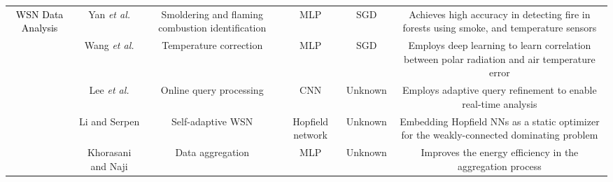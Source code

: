 \documentclass[journal,comsoc,letter]{IEEEtran}
\newcommand{\rev}[1]{\textcolor{black}{#1}}
\begin{document}
\begin{table*}[h!]
\begin{tabular}{|c|C{2CM}|C{3CM}|C{1.5CM}|C{2CM}|C{3.8CM}|}
\multirow{7}{*}{\rev{WSN Data Analysis}}              & Yan \emph{et al.} \cite{yan2016real}                         & Smoldering and flaming combustion identification                                                       & MLP                                          & SGD                                                           & Achieves high accuracy in detecting fire in forests using smoke,  and temperature sensors                                                     \\  
                                                     & Wang \emph{et al.} \cite{wang2017temperature}                & Temperature correction                                                                                 & MLP                                          & SGD                                                           & Employs deep learning to learn correlation between polar radiation and air temperature error                                                        \\  
                                                     & Lee \emph{et al.} \cite{lee2017deep222}                      & Online query processing                                                                                & CNN                                          & Unknown                                                       & Employs adaptive query refinement to enable real-time analysis                                                                                      \\  
                                                     & Li and Serpen \cite{li2016adaptive}                          & Self-adaptive WSN                                                                                      & Hopfield network                             & Unknown                                                       & Embedding Hopfield NNs as a static optimizer for the weakly-connected dominating problem                                                            \\  
                                                     & Khorasani and Naji \cite{khorasani2017energy}                & Data aggregation                                                                                       & MLP                                          & Unknown                                                       & Improves the energy efficiency in the aggregation process                                                                                           \\  

\end{tabular}
\end{table*}
\end{document}
